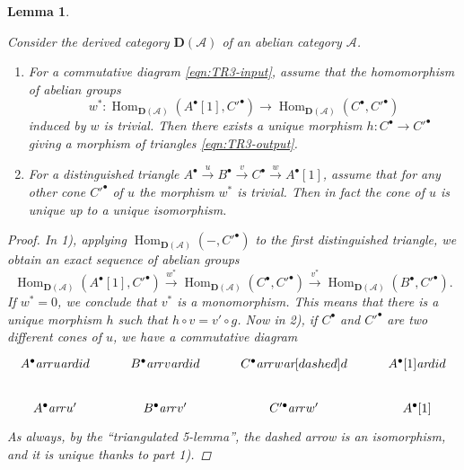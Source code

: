 \documentclass[draft,leqno,12pt]{article}
\theoremstyle{plain}
\newtheorem{lemma}[theorem]{\indent\sc Lemma}
\theoremstyle{definition}
\DeclareMathOperator{\Hom}{Hom}
\newcommand{\ar}{\text{\it ar}}
\begin{document}
\begin{lemma}
  \label{TR3-TR1-with-uniqueness-general-statement}

  Consider the derived category $\mathbf{D} (\mathcal{A})$ of an abelian
  category $\mathcal{A}$.

  \begin{enumerate}
  \item[$1)$] For a commutative diagram \eqref{eqn:TR3-input}, assume that the
    homomorphism of abelian groups
    \[ w^*\colon \Hom_{\mathbf{D} (\mathcal{A})} (A^\bullet [1], C'^\bullet) \to
    \Hom_{\mathbf{D} (\mathcal{A})} (C^\bullet, C'^\bullet) \]
    induced by $w$ is trivial. Then there exists a unique morphism
    $h\colon C^\bullet \to C'^\bullet$ giving a morphism of triangles
    \eqref{eqn:TR3-output}.

  \item[$2)$] For a distinguished triangle
    $A^\bullet \xrightarrow{u} B^\bullet \xrightarrow{v} C^\bullet \xrightarrow{w} A^\bullet[1]$,
    assume that for any other cone $C'^\bullet$
    of $u$ the morphism $w^*$ is trivial. Then in fact the cone of $u$ is unique
    up to a unique isomorphism.
  \end{enumerate}

  \begin{proof}
    In 1), applying $\Hom_{\mathbf{D} (\mathcal{A})} (-, C'^\bullet)$ to the
    first distinguished triangle, we obtain an exact sequence of abelian groups
    \[ \Hom_{\mathbf{D} (\mathcal{A})} (A^\bullet [1], C'^\bullet) \xrightarrow{w^*}
    \Hom_{\mathbf{D} (\mathcal{A})} (C^\bullet, C'^\bullet) \xrightarrow{v^*}
    \Hom_{\mathbf{D} (\mathcal{A})} (B^\bullet, C'^\bullet). \]
    If $w^* = 0$, we conclude that $v^*$ is a monomorphism. This means that
    there is a unique morphism $h$ such that $h\circ v = v'\circ g$. Now in 2),
    if $C^\bullet$ and $C'^\bullet$ are two different cones of $u$, we have a
    commutative diagram
    \[ \begin{tikzcd}
      A^\bullet\ar{r}{u}\ar{d}{id} & B^\bullet\ar{r}{v}\ar{d}{id} & C^\bullet\ar{r}{w}\ar[dashed]{d} & A^\bullet [1]\ar{d}{id} \\
      A^\bullet\ar{r}{u'} & B^\bullet\ar{r}{v'} & C'^\bullet\ar{r}{w'} & A^\bullet [1]
    \end{tikzcd} \]
    As always, by the ``triangulated 5-lemma'', the dashed arrow is an
    isomorphism, and it is unique thanks to part 1).
  \end{proof}
\end{lemma}
\end{document}
